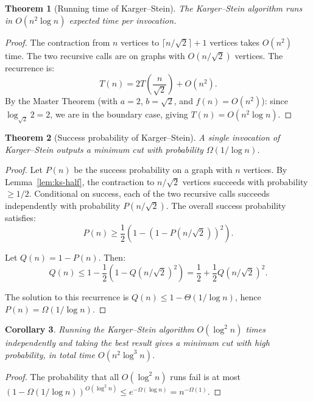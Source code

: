 \documentclass[twoside,12pt]{book}
\theoremstyle{plain}
\newtheorem{theorem}{Theorem}[chapter]
\newtheorem{corollary}[theorem]{Corollary}
\theoremstyle{definition}
\theoremstyle{remark}
\begin{document}
\begin{theorem}[Running time of Karger--Stein]
\label{thm:karger-stein-time}
The Karger--Stein algorithm runs in $O(n^2 \log n)$ expected time per invocation.
\end{theorem}

\begin{proof}
The contraction from $n$ vertices to $\lceil n/\sqrt{2} \rceil + 1$ vertices takes $O(n^2)$ time. The two recursive calls are on graphs with $O(n/\sqrt{2})$ vertices. The recurrence is:
\[
T(n) = 2T\!\left(\frac{n}{\sqrt{2}}\right) + O(n^2).
\]
By the Master Theorem (with $a = 2$, $b = \sqrt{2}$, and $f(n) = O(n^2)$): since $\log_{\sqrt{2}} 2 = 2$, we are in the boundary case, giving $T(n) = O(n^2 \log n)$.
\end{proof}

\begin{theorem}[Success probability of Karger--Stein]
\label{thm:ks-prob}
A single invocation of Karger--Stein outputs a minimum cut with probability $\Omega(1 / \log n)$.
\end{theorem}

\begin{proof}
Let $P(n)$ be the success probability on a graph with $n$ vertices. By Lemma~\ref{lem:ks-half}, the contraction to $n/\sqrt{2}$ vertices succeeds with probability $\geq 1/2$. Conditional on success, each of the two recursive calls succeeds independently with probability $P(n/\sqrt{2})$. The overall success probability satisfies:
\[
P(n) \geq \frac{1}{2} \left(1 - (1 - P(n/\sqrt{2}))^2\right).
\]

Let $Q(n) = 1 - P(n)$. Then:
\[
Q(n) \leq 1 - \frac{1}{2}(1 - Q(n/\sqrt{2})^2) = \frac{1}{2} + \frac{1}{2}Q(n/\sqrt{2})^2.
\]

The solution to this recurrence is $Q(n) \leq 1 - \Theta(1/\log n)$, hence $P(n) = \Omega(1/\log n)$.
\end{proof}

\begin{corollary}
Running the Karger--Stein algorithm $O(\log^2 n)$ times independently and taking the best result gives a minimum cut with high probability, in total time $O(n^2 \log^3 n)$.
\end{corollary}

\begin{proof}
The probability that all $O(\log^2 n)$ runs fail is at most $(1 - \Omega(1/\log n))^{O(\log^2 n)} \leq e^{-\Omega(\log n)} = n^{-\Omega(1)}$.
\end{proof}
\end{document}
